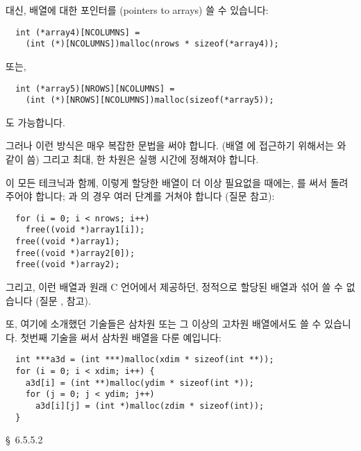 \begin{faq}
	대신, 배열에 대한 포인터를 (pointers to arrays) 쓸 수 있습니다:
\begin{verbatim}
  int (*array4)[NCOLUMNS] =
    (int (*)[NCOLUMNS])malloc(nrows * sizeof(*array4));
\end{verbatim}

	또는,

\begin{verbatim}
  int (*array5)[NROWS][NCOLUMNS] =
    (int (*)[NROWS][NCOLUMNS])malloc(sizeof(*array5));
\end{verbatim}
	\noindent 도 가능합니다.

	그러나 이런 방식은 매우 복잡한 문법을 써야 합니다. (배열 에
	접근하기 위해서는 와 같이 씀) 그리고 최대, 한
	차원은 실행 시간에 정해져야 합니다.

	이 모든 테크닉과 함께, 이렇게 할당한 배열이 더 이상 필요없을 때에는,
	를 써서 돌려 주어야 합니다; 과 의 경우
	여러 단계를 거쳐야 합니다 (질문  참고):
\begin{verbatim}
  for (i = 0; i < nrows; i++)
    free((void *)array1[i]);
  free((void *)array1);
  free((void *)array2[0]);
  free((void *)array2);
\end{verbatim}

	그리고, 이런 배열과 원래 C 언어에서 제공하던, 정적으로 할당된 배열과
	섞어 쓸 수 없습니다 (질문 ,  참고).

	또, 여기에 소개했던 기술들은 삼차원 또는 그 이상의 고차원 배열에서도
	쓸 수 있습니다. 첫번째 기술을 써서 삼차원 배열을 다룬 예입니다:
\begin{verbatim}
  int ***a3d = (int ***)malloc(xdim * sizeof(int **));
  for (i = 0; i < xdim; i++) {
    a3d[i] = (int **)malloc(ydim * sizeof(int *));
    for (j = 0; j < ydim; j++)
      a3d[i][j] = (int *)malloc(zdim * sizeof(int));
  }
\end{verbatim}
\R
	\cite{c9x} \S\ 6.5.5.2
\end{faq}

